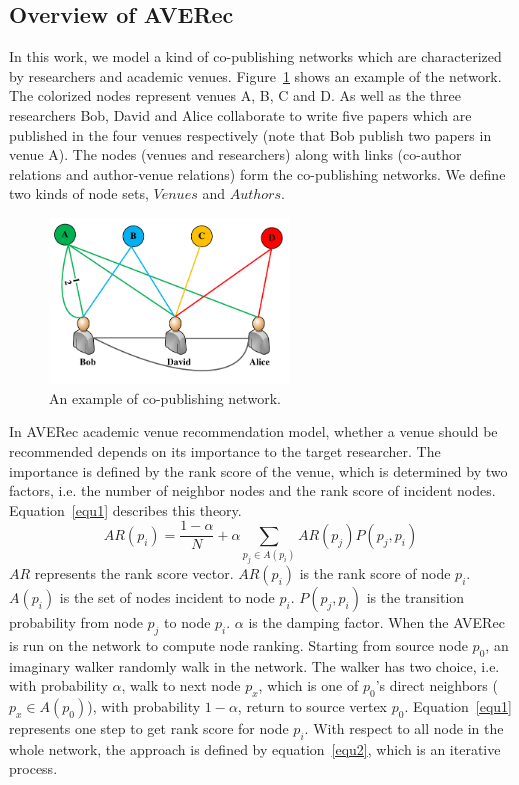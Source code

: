\documentclass[9pt]{acm_proc_article-sp}
\begin{document}
\subsection{Overview of AVERec}
In this work, we model a kind of co-publishing networks which are characterized by researchers and academic venues. Figure~\ref{Fig2} shows an example of the network. The colorized nodes represent venues A, B, C and D. As well as the three researchers Bob, David and Alice collaborate to write five papers which are published in the four venues respectively (note that Bob publish two papers in venue A). The nodes (venues and researchers) along with links (co-author relations and author-venue relations) form the co-publishing networks. We define two kinds of node sets, $Venues$ and $Authors$.
\begin{figure}[!ht]
\centering
\includegraphics [width=2.5in]{Fig2.pdf}
\caption{An example of co-publishing network.}
\label{Fig2}
\end{figure}
In AVERec academic venue recommendation model, whether a venue should be recommended depends on its importance to the target researcher. The importance is defined by the rank score of the venue, which is determined by two factors, i.e. the number of neighbor nodes and the rank score of incident nodes. Equation~\ref{equ1} describes this theory.
\begin{equation}
\label{equ1}
AR(p_{i})=\frac{1-\alpha}{N}+\alpha \sum_{p_{j}\in A(p_{i})}AR(p_{j})P(p_{j},p_{i})
\end{equation}
$AR$ represents the rank score vector. $AR(p_{i})$ is the rank score of node $p_{i}$. $A(p_{i})$ is the set of nodes incident to node $p_{i}$. $P(p_{j},p_{i})$ is the transition probability from node $p_{j}$ to node $p_{i}$. $\alpha$ is the damping factor. When the AVERec is run on the network to compute node ranking. Starting from source node $p_{0}$, an imaginary walker randomly walk in the network. The walker has two choice, i.e. with probability $\alpha$, walk to next node $p_{x}$, which is one of $p_{0}$'s direct neighbors ($p_{x}\in A(p_{0})$), with probability $1-\alpha$, return to source vertex $p_{0}$. Equation~\ref{equ1} represents one step to get rank score for node $p_{i}$. With respect to all node in the whole network, the approach is defined by equation~\ref{equ2}, which is an iterative process.
\end{document}
